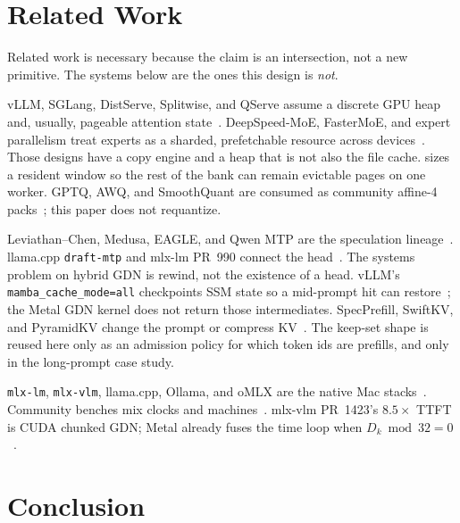 \section{Related Work}
\label{sec:related}

Related work is necessary because the claim is an intersection, not a new primitive. The systems below are the ones this design is \emph{not}.

vLLM, SGLang, DistServe, Splitwise, and QServe assume a discrete GPU heap and, usually, pageable attention state~\citep{kwon2023vllm,zheng2024sglang,zhong2024distserve,patel2024splitwise,lin2024qserve}. DeepSpeed-MoE, FasterMoE, and expert parallelism treat experts as a sharded, prefetchable resource across devices~\citep{rajbhandari2022deepspeed,he2022fastermoe}. Those designs have a copy engine and a heap that is not also the file cache. \slotbank{} sizes a resident window so the rest of the bank can remain evictable pages on one worker. GPTQ, AWQ, and SmoothQuant are consumed as community affine-4 packs~\citep{frantar2023gptq,lin2024awq,xiao2024smoothquant}; this paper does not requantize.

Leviathan--Chen, Medusa, EAGLE, and Qwen MTP are the speculation lineage~\citep{leviathan2023speculative,chen2023accelerating,cai2024medusa,li2024eagle,qwen3}. llama.cpp \texttt{draft-mtp} and mlx-lm PR~990 connect the head~\citep{ctaylor83mtp,mlxlm990}. The systems problem on hybrid GDN is rewind, not the existence of a head. vLLM’s \texttt{mamba\_cache\_mode=all} checkpoints SSM state so a mid-prompt hit can restore~\citep{vllm36649}; the Metal GDN kernel does not return those intermediates. SpecPrefill, SwiftKV, and PyramidKV change the prompt or compress KV~\citep{yuan2024specprefill,swiftkv,pyramidkv}. The keep-set shape is reused here only as an admission policy for which token ids are prefills, and only in the long-prompt case study.

\texttt{mlx-lm}, \texttt{mlx-vlm}, llama.cpp, Ollama, and oMLX are the native Mac stacks~\citep{mlx2023,mlxlm,mlxvlm,llamacpp,ollama019,omlx2874}. Community benches mix clocks and machines~\citep{terminalbytes2026,orcarouter2026,weschera2026,nathanmaine}. mlx-vlm PR~1423’s $8.5{\times}$ TTFT is CUDA chunked GDN; Metal already fuses the time loop when $D_k \bmod 32 = 0$~\citep{mlxvlm1423}.

\section{Conclusion}
\label{sec:conc}

